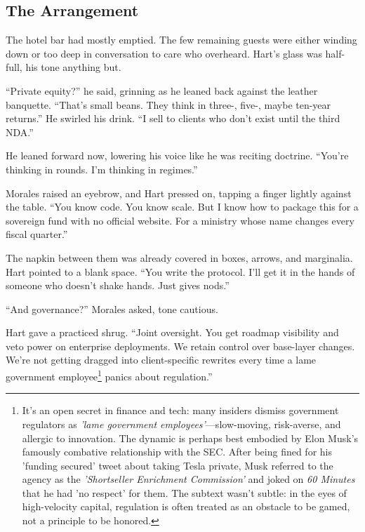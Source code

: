 \medskip

\subsection{The Arrangement}

The hotel bar had mostly emptied. The few remaining guests were either winding down or too deep in conversation to 
care who overheard. Hart’s glass was half-full, his tone anything but.

``Private equity?'' he said, grinning as he leaned back against the leather banquette. ``That’s small beans. They think 
in three-, five-, maybe ten-year returns.” He swirled his drink. “I sell to clients who don’t exist until the 
third NDA.''

He leaned forward now, lowering his voice like he was reciting doctrine. ``You’re thinking in rounds. 
I’m thinking in regimes.''

Morales raised an eyebrow, and Hart pressed on, tapping a finger lightly against the table. ``You know code. 
You know scale. But I know how to package this for a sovereign fund with no official website. For a ministry whose name 
changes every fiscal quarter.''

The napkin between them was already covered in boxes, arrows, and marginalia. Hart pointed to a blank space. ``You 
write the protocol. I’ll get it in the hands of someone who doesn’t shake hands. Just gives nods.''

``And governance?'' Morales asked, tone cautious.

Hart gave a practiced shrug. ``Joint oversight. You get roadmap visibility and veto power on enterprise deployments. 
We retain control over base-layer changes. We’re not getting dragged into client-specific rewrites every time a 
lame government employee\footnote{
It’s an open secret in finance and tech: many insiders dismiss government regulators as \emph{'lame government 
employees'}—slow-moving, risk-averse, and allergic to innovation. The dynamic is perhaps best embodied by Elon Musk’s 
famously combative relationship with the SEC. After being fined for his 'funding secured' tweet about taking Tesla 
private, Musk referred to the agency as the \emph{'Shortseller Enrichment Commission'} and joked on \emph{60 
Minutes} that he had 'no respect' for them. The subtext wasn’t subtle: in the eyes of high-velocity capital, 
regulation is often treated as an obstacle to be gamed, not a principle to be honored.
}
panics about regulation.''

